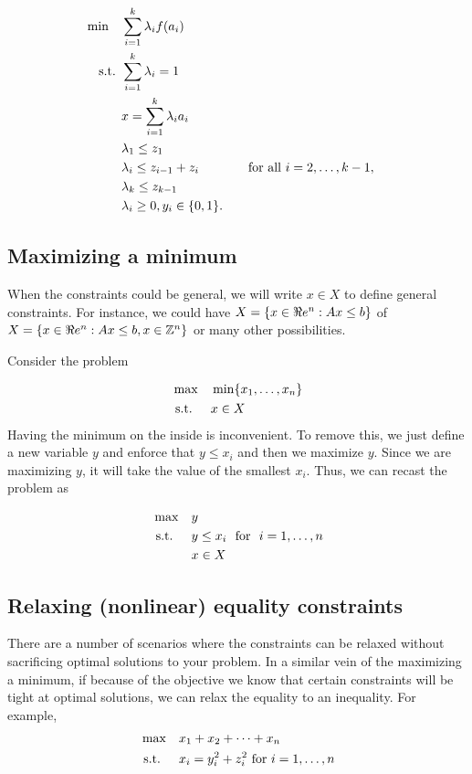 \begin{align*}
\min \quad & \sum_{i=1}^k \lambda_i f(a_i) \\
\mbox{ s.t. }        & \sum_{i=1}^k \lambda_i = 1 \\
& x = \sum_{i=1}^k \lambda_i a_i \\
& \lambda_1 \leq z_1 \\
& \lambda_i \leq z_{i-1} + z_{i} &&\quad \mbox{for all } i=2, \dots, k-1, \\
& \lambda_k \leq z_{k-1} \\
& \lambda_i \geq 0, y_i \in \{0,1\}.
\end{align*}

\subsection{Maximizing a minimum}
When the constraints could be general, we will write $x \in X$ to define general constraints.  For instance, we could have $X = \{ x \in \Re e^n : Ax \leq b\}$ of $X  = \{ x \in \Re e^n : Ax \leq b, x \in \mathbb{Z}^n\}$ or many other possibilities.  

Consider the problem 

\begin{align*}
\max \quad & \min \{x_1, \dots, x_n\}\\
\mbox{ s.t. } \quad  & x \in X
\end{align*}
Having the minimum on the inside is inconvenient.  To remove this, we just define a new variable $y$ and enforce that $y \leq x_i$ and then we maximize $y$.  Since we are maximizing $y$, it will take the value of the smallest $x_i$.  Thus, we can recast the problem as

\begin{align*}
\max \quad & y\\
\mbox{ s.t. } \quad  & y \leq x_i \ \mbox{ for }\  i=1, \dots, n \\
& x \in X
\end{align*}

\subsection{Relaxing (nonlinear) equality constraints}

There are a number of scenarios where the constraints can be relaxed without sacrificing optimal solutions to your problem.   In a similar vein of the maximizing a minimum, if because of the objective we know that certain constraints will be tight at optimal solutions, we can relax the equality to an inequality.   For example, 
\begin{align*}
\max \quad & x_1 + x_2 +  \dots + x_n\\
\mbox{ s.t. } \quad  & x_i = y_i^2 + z_i^2 \mbox{ for } i=1, \dots, n
\end{align*}

